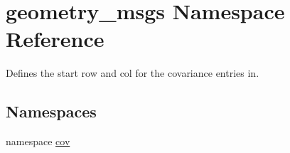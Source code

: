 \hypertarget{namespacegeometry__msgs}{\section{geometry\-\_\-msgs Namespace Reference}
\label{namespacegeometry__msgs}
}


Defines the start row and col for the covariance entries in.  


\subsection*{Namespaces}
\begin{DoxyCompactItemize}
\item 
namespace \hyperlink{namespacegeometry__msgs_1_1cov}{cov}
\end{DoxyCompactItemize}
